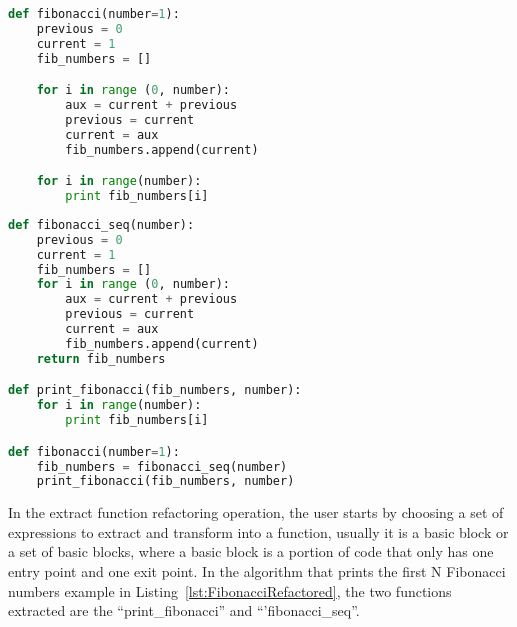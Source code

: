



\begin{lstlisting}[frame=single, caption=Algorithm first implementation, label={lst:Fibonacci}, language=Python]
def fibonacci(number=1):
	previous = 0
	current = 1
	fib_numbers = []

	for i in range (0, number):
		aux = current + previous
		previous = current
		current = aux
		fib_numbers.append(current)

	for i in range(number):
		print fib_numbers[i]
\end{lstlisting}


\begin{lstlisting}[frame=single, caption=Algorithm after using extract function, label={lst:FibonacciRefactored}, language=Python]
def fibonacci_seq(number):
	previous = 0
	current = 1
	fib_numbers = []
	for i in range (0, number):
		aux = current + previous
		previous = current
		current = aux
		fib_numbers.append(current)
	return fib_numbers

def print_fibonacci(fib_numbers, number):
	for i in range(number):
		print fib_numbers[i]

def fibonacci(number=1):
	fib_numbers = fibonacci_seq(number)
	print_fibonacci(fib_numbers, number)
\end{lstlisting}


In the extract function refactoring operation, the user starts by choosing a set of expressions to extract and transform into a function, usually it is a  basic block or a set of basic blocks, where a basic block is a portion of code that only has one entry point and one exit point.
In the algorithm that prints the first N Fibonacci numbers example in Listing~\ref{lst:FibonacciRefactored}, the two functions extracted are the ``print\_fibonacci'' and ``'fibonacci\_seq''.

